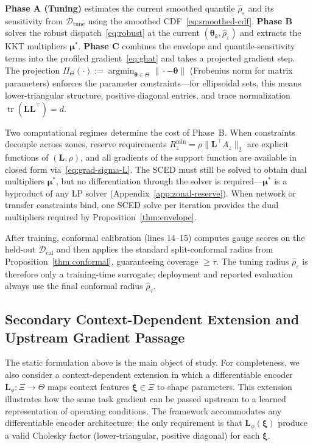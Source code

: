 \documentclass[11pt]{article}
\newcommand{\cD}{\mathcal{D}}
\newcommand{\btheta}{\bm{\theta}}
\newcommand{\bmu}{\bm{\mu}}
\newcommand{\bxi}{\bm{\xi}}
\newcommand{\bL}{\bm{L}}
\DeclareMathOperator{\argmin}{argmin}
\DeclareMathOperator{\tr}{tr}
\theoremstyle{definition}
\begin{document}
\textbf{Phase A (Tuning)} estimates the current smoothed quantile $\hat{\rho}_\varepsilon$ and its sensitivity from $\cD_{\text{tune}}$ using the smoothed CDF~\eqref{eq:smoothed-cdf}. \textbf{Phase B} solves the robust dispatch~\eqref{eq:robust} at the current $(\btheta_k, \hat{\rho}_\varepsilon)$ and extracts the KKT multipliers $\bmu^*$. \textbf{Phase C} combines the envelope and quantile-sensitivity terms into the profiled gradient~\eqref{eq:ghat} and takes a projected gradient step. The projection $\Pi_\Theta(\cdot):=\argmin_{\btheta\in\Theta}\|\cdot-\btheta\|$ (Frobenius norm for matrix parameters) enforces the parameter constraints---for ellipsoidal sets, this means lower-triangular structure, positive diagonal entries, and trace normalization $\tr(\bL\bL^\top) = d$.

Two computational regimes determine the cost of Phase~B. When constraints decouple across zones, reserve requirements $R_z^{\min} = \rho\|\bL^\top A_z\|_2$ are explicit functions of $(\bL,\rho)$, and all gradients of the support function are available in closed form via~\eqref{eq:grad-sigma-L}. The SCED must still be solved to obtain dual multipliers $\bmu^*$, but no differentiation through the solver is required---$\bmu^*$ is a byproduct of any LP solver (Appendix~\ref{app:zonal-reserve}). When network or transfer constraints bind, one SCED solve per iteration provides the dual multipliers required by Proposition~\ref{thm:envelope}.

After training, conformal calibration (lines 14--15) computes gauge scores on the held-out $\cD_{\text{cal}}$ and then applies the standard split-conformal radius from Proposition~\ref{thm:conformal}, guaranteeing coverage $\geq \tau$. The tuning radius $\hat{\rho}_\varepsilon$ is therefore only a training-time surrogate; deployment and reported evaluation always use the final conformal radius $\hat{\rho}_\tau$.

\subsection{Secondary Context-Dependent Extension and Upstream Gradient Passage}

The static formulation above is the main object of study. For completeness, we also consider a context-dependent extension in which a differentiable encoder $\bL_\phi: \Xi \to \Theta$ maps context features $\bxi \in \Xi$ to shape parameters. This extension illustrates how the same task gradient can be passed upstream to a learned representation of operating conditions. The framework accommodates any differentiable encoder architecture; the only requirement is that $\bL_\phi(\bxi)$ produce a valid Cholesky factor (lower-triangular, positive diagonal) for each $\bxi$.
\end{document}
